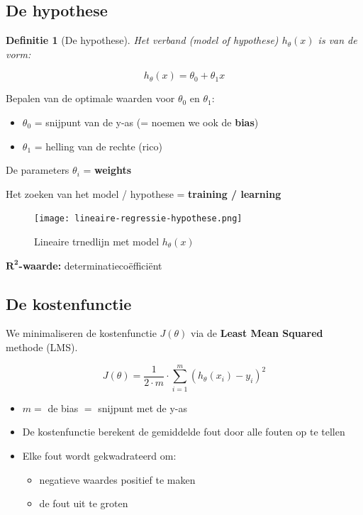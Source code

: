 \documentclass{article}
\newtheorem{theorem}{Definitie}[section]
\begin{document}
\subsection{De hypothese}

\begin{theorem}[De hypothese]
Het verband (model of hypothese) $h_{\theta}(x)$ is van de vorm:

\begin{equation}
h_{\theta}(x) = \theta_0 + \theta_1x
\end{equation}
\end{theorem}

Bepalen van de optimale waarden voor $\theta_0$ en $\theta_1$:

\begin{itemize}
    \item $\theta_0$ = snijpunt van de y-as (= noemen we ook de \textbf{bias})
    \item $\theta_1$ = helling van de rechte (rico)
\end{itemize}

De parameters $\theta_i$ = \textbf{weights}

Het zoeken van het model / hypothese = \textbf{training / learning}

\begin{figure}[H]
    \centering
    \texttt{[image: lineaire-regressie-hypothese.png]}
    \caption{Lineaire trnedlijn met model $h_{\theta}(x)$}
\end{figure}

$\mathbf{R^2}$\textbf{-waarde:} determinatiecoëfficiënt

\subsection{De kostenfunctie}

We minimaliseren de kostenfunctie $J(\theta)$ via de \textbf{Least Mean Squared} methode (LMS). 

\begin{equation}
J(\theta) = \frac{1}{2\cdot m} \cdot \sum_{i=1}^m (h_{\theta}(x_i) - y_i)^2
\end{equation}

\begin{itemize}
    \item $m =$ de bias $=$ snijpunt met de y-as
    \item De kostenfunctie berekent de gemiddelde fout door alle fouten op te tellen
    \item Elke fout wordt gekwadrateerd om:
    \begin{itemize}
        \item negatieve waardes positief te maken
        \item de fout uit te groten
    \end{itemize}
\end{itemize}
\end{document}
